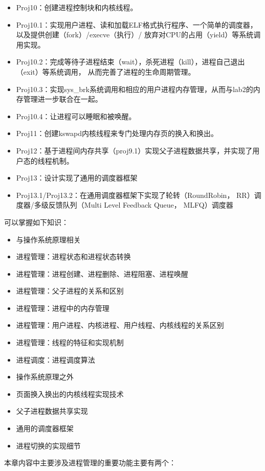 \begin{itemize}
\tightlist
\item
  Proj10：创建进程控制块和内核线程。
\item
  Proj10.1：实现用户进程、读和加载ELF格式执行程序、一个简单的调度器，以及提供创建（fork）/execve（执行）/
  放弃对CPU的占用（yield）等系统调用实现。
\item
  Proj10.2：完成等待子进程结束（wait），杀死进程（kill），进程自己退出（exit）等系统调用，
  从而完善了进程的生命周期管理。
\item
  Proj10.3：实现sys\_brk系统调用和相应的用户进程内存管理，从而与lab2的内存管理进一步联合在一起。
\item
  Proj10.4：让进程可以睡眠和被唤醒。
\item
  Proj11：创建kswapd内核线程来专门处理内存页的换入和换出。
\item
  Proj12：基于进程间内存共享（proj9.1）实现父子进程数据共享，并实现了用户态的线程机制。
\item
  Proj13：设计实现了通用的调度器框架
\item
  Proj13.1/Proj13.2：在通用调度器框架下实现了轮转（RoundRobin，
  RR）调度器/多级反馈队列（Multi Level Feedback Queue， MLFQ）调度器
\end{itemize}

可以掌握如下知识：

\begin{itemize}
\tightlist
\item
  与操作系统原理相关
\item
  进程管理：进程状态和进程状态转换
\item
  进程管理：进程创建、进程删除、进程阻塞、进程唤醒
\item
  进程管理：父子进程的关系和区别
\item
  进程管理：进程中的内存管理
\item
  进程管理：用户进程、内核进程、用户线程、内核线程的关系区别
\item
  进程管理：线程的特征和实现机制
\item
  进程调度：进程调度算法
\item
  操作系统原理之外
\item
  页面换入换出的内核线程实现技术
\item
  父子进程数据共享实现
\item
  通用的调度器框架
\item
  进程切换的实现细节
\end{itemize}

本章内容中主要涉及进程管理的重要功能主要有两个：

